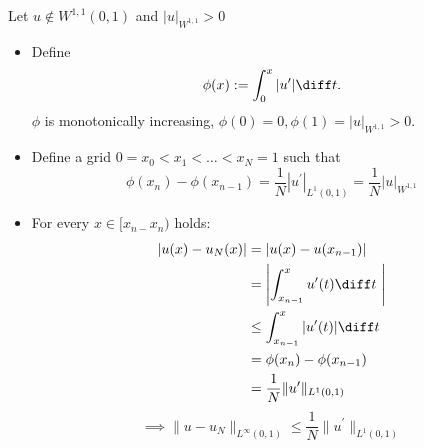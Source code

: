 \begin{example}
\begin{enumerate}[label = \Roman*)]
			Let $u \not \in W^{1,1}(0,1)$ and $|u|_{W^{1,1}}>0$
			\begin{itemize}
				\item Define 
					\begin{equation*}
						\phi(x) := \int_{0}^x |u^\prime | \diff t.
					\end{equation*} 
					$\phi$ is monotonically increasing, $\phi(0)=0,\phi(1)=|u|_{W^{1,1}} > 0$.
				\item Define a grid $0 = x_{0} < x_{1}< \dots < x_{N} = 1$ such that 
					\begin{equation*}
						\phi(x_{n}) - \phi(x_{n-1}) = \frac{1}{N} |u^\prime|_{L^1(0,1)}= \frac{1}{N} |u|_{W^{1,1}}
					\end{equation*} 
				\item For every $x \in [x_{n-}x_{n})$ holds:
					\begin{align*}
						|u(x)-u_{N}(x)|&= |u(x)-u(x_{n-1})|\\
									   &= \left| \int_{x_{n-1}}^{x} u^\prime(t) \diff t\ \right|\\
									   &\leq \int_{x_{n-1}}^{x} |u^\prime(t)| \diff t\\\
									   &= \phi(x_{n}) - \phi(x_{n-1}) \\
									   &= \frac{1}{N} \|u^\prime\|_{L^{1}(0,1)}						   
					\end{align*} 
					\begin{equation*}
						\implies \|u - u_{N}\|_{L^{\infty}(0,1)} \leq \frac{1}{N} \|u^\prime\|_{L^{1}(0,1)}
					\end{equation*} 
			\end{itemize} 
	\end{enumerate} 
\end{example} 
